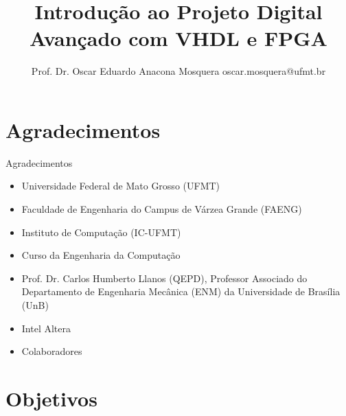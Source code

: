 \documentclass[aspectratio=169]{beamer}
\title[Minicurso FPGAs]{\huge   Introdução ao Projeto Digital Avançado com VHDL e FPGA} %
\author[Prof. Dr. Oscar Eduardo Anacona Mosquera]{Prof. Dr. Oscar Eduardo Anacona Mosquera \newline\newline 
\scriptsize{oscar.mosquera@ufmt.br}
}%
\begin{document}
\begin{frame}[plain]
\titlepage

\end{frame}


\section{Agradecimentos}



\begin{frame}{Agradecimentos}
	
	\begin{itemize}
		\item Universidade Federal de Mato Grosso (UFMT)
		\item Faculdade de Engenharia do Campus de Várzea Grande (FAENG)
		\item Instituto de Computação (IC-UFMT)
		\item Curso da Engenharia da Computação
		\item Prof. Dr. Carlos Humberto Llanos (QEPD), Professor Associado do Departamento de Engenharia Mecânica (ENM) da Universidade de Brasília (UnB)
		\item  Intel Altera
		\item  Colaboradores
	\end{itemize}	
	
\end{frame}
\section{Objetivos}
\end{document}
